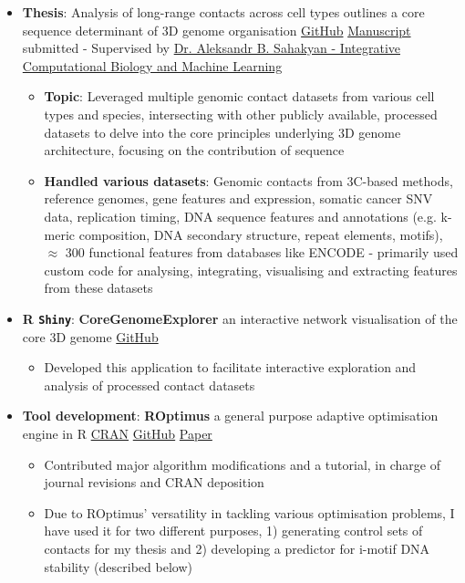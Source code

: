 \documentclass[a4paper,11pt]{article}
\newcommand{\resumeItem}[2]{
  \item\small{
    \textbf{#1}{: #2 \vspace{-2pt}}
  }
}
\newcommand{\resumeItemListStart}{\begin{itemize}}
\newcommand{\resumeItemListEnd}{\end{itemize}\vspace{-5pt}}
\begin{document}
            \resumeItemListStart
                \resumeItem{Thesis}{Analysis of long-range contacts across cell types outlines a core sequence determinant of 3D genome organisation \href{https://github.com/SahakyanLab/GenomicContactDynamics}{GitHub} \href{https://drive.google.com/file/d/1j3xg4ipr3ruG7vPtyXWO4wrDjJaRznfg/view?usp=share_link}{Manuscript} submitted - Supervised by \href{https://www.imm.ox.ac.uk/research/research-groups/sahakyan-group-integrative-computational-biology-and-machine-learning}{Dr. Aleksandr B. Sahakyan - Integrative Computational Biology and Machine Learning}}
                    \begin{itemize}
                        \resumeItem {Topic}{Leveraged multiple genomic contact datasets from various cell types and species, intersecting with other publicly available, processed datasets to delve into the core principles underlying 3D genome architecture, focusing on the contribution of sequence}
                        \resumeItem {Handled various datasets}{Genomic contacts from 3C-based methods, reference genomes, gene features and expression, somatic cancer SNV data, replication timing, DNA sequence features and annotations (e.g. k-meric composition, DNA secondary structure, repeat elements, motifs), $\approx$ 300 functional features from databases like ENCODE - primarily used custom code for analysing, integrating, visualising and extracting features from these datasets}
                    \end{itemize}
            \resumeItemListEnd

            \resumeItemListStart
                \resumeItem{R \texttt{Shiny}}{\textbf{CoreGenomeExplorer} an interactive network visualisation of the core 3D genome \href{https://github.com/liezeltamon/CoreGenomeExplorerLite}{GitHub}}
                    \begin{itemize}
                        \item {Developed this application to facilitate interactive exploration and analysis of processed contact datasets}
                    \end{itemize}
            \resumeItemListEnd
            
            \resumeItemListStart
                \resumeItem{Tool development}{\textbf{ROptimus} a general purpose adaptive optimisation engine in R \href{https://cran.r-project.org/web/packages/ROptimus/index.html}{CRAN} \href{https://github.com/SahakyanLab/ROptimus}{GitHub} \href{https://academic.oup.com/bioinformatics/article/39/5/btad292/7152277}{Paper}}
                    \begin{itemize}
                        \item {Contributed major algorithm modifications and a tutorial, in charge of journal revisions and CRAN deposition}
                        \item {Due to ROptimus' versatility in tackling various optimisation problems, I have used it for two different purposes, 1) generating control sets of contacts for my thesis and 2) developing a predictor for i-motif DNA stability (described below)}
                    \end{itemize}
            \resumeItemListEnd
            
\end{document}
